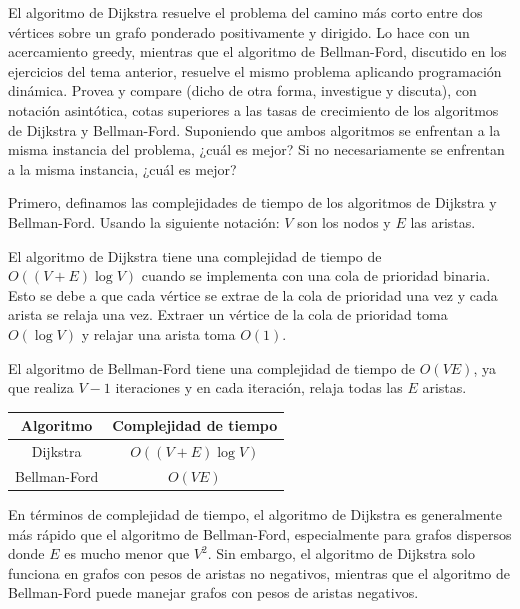\begin{problema}
\begin{enumerate}
\begin{sol}
        \end{sol}
    \end{enumerate}



\end{problema}


\begin{problema}
    El algoritmo de Dijkstra resuelve el problema del camino más corto entre dos vértices sobre un grafo ponderado positivamente y dirigido. Lo hace con un acercamiento greedy, mientras que el algoritmo de Bellman-Ford, discutido en los ejercicios del tema anterior, resuelve el mismo problema aplicando programación dinámica. Provea y compare (dicho de otra forma, investigue y discuta), con notación asintótica, cotas superiores a las tasas de crecimiento de los algoritmos de Dijkstra y Bellman-Ford. Suponiendo que ambos algoritmos se enfrentan a la misma instancia del problema, ¿cuál es mejor? Si no necesariamente se enfrentan a la misma instancia, ¿cuál es mejor?

    \begin{sol}
        Primero, definamos las complejidades de tiempo de los algoritmos de Dijkstra y Bellman-Ford. Usando la siguiente notación: $V$ son los nodos y $E$ las aristas.\bigbreak

El algoritmo de Dijkstra tiene una complejidad de tiempo de $O((V+E) \log V)$ cuando se implementa con una cola de prioridad binaria. Esto se debe a que cada vértice se extrae de la cola de prioridad una vez y cada arista se relaja una vez. Extraer un vértice de la cola de prioridad toma $O(\log V)$ y relajar una arista toma $O(1)$.\bigbreak

El algoritmo de Bellman-Ford tiene una complejidad de tiempo de $O(VE)$, ya que realiza $V-1$ iteraciones y en cada iteración, relaja todas las $E$ aristas.


\begin{center}
    \begin{tabular}{|c|c|}
        \hline
        Algoritmo & Complejidad de tiempo \\
        \hline
        Dijkstra & $O((V+E) \log V)$ \\
        Bellman-Ford & $O(VE)$ \\
        \hline
        \end{tabular}
\end{center}



En términos de complejidad de tiempo, el algoritmo de Dijkstra es generalmente más rápido que el algoritmo de Bellman-Ford, especialmente para grafos dispersos donde $E$ es mucho menor que $V^2$. Sin embargo, el algoritmo de Dijkstra solo funciona en grafos con pesos de aristas no negativos, mientras que el algoritmo de Bellman-Ford puede manejar grafos con pesos de aristas negativos.\bigbreak


\end{sol}
\end{problema}
